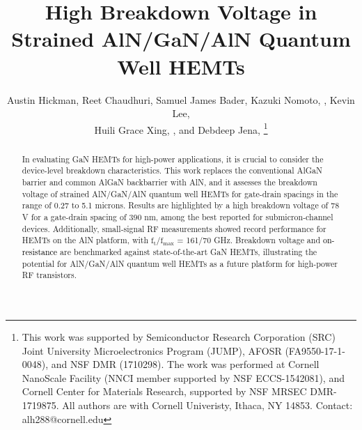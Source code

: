 \documentclass[journal]{IEEEtran}
\newif\ifarxiv
\begin{document}
\title{High Breakdown Voltage in Strained AlN/GaN/AlN Quantum Well HEMTs}

\author{Austin Hickman, Reet Chaudhuri, Samuel James Bader, Kazuki Nomoto, , Kevin Lee, \\ Huili Grace Xing, , and Debdeep Jena, %
\thanks{
  This work was supported by Semiconductor Research Corporation (SRC) Joint University Microelectronics Program (JUMP), AFOSR (FA9550-17-1-0048), and NSF DMR (1710298). The work was performed at Cornell NanoScale Facility (NNCI member supported by NSF ECCS-1542081), and Cornell Center for Materials Research, supported by NSF MRSEC DMR-1719875. All authors are with Cornell Univeristy, Ithaca, NY 14853. Contact: alh288@cornell.edu }}

\ifarxiv \else
{}%
{}
\fi
% 

\maketitle

\begin{abstract}
In evaluating GaN HEMTs for high-power applications, it is crucial to consider the device-level breakdown characteristics. This work replaces the conventional AlGaN barrier and common AlGaN backbarrier with AlN, and it assesses the breakdown voltage of strained AlN/GaN/AlN quantum well HEMTs for gate-drain spacings in the range of 0.27 to 5.1 microns. Results are highlighted by a high breakdown voltage of 78 V for a gate-drain spacing of 390 nm, among the best reported for submicron-channel devices. Additionally, small-signal RF measurements showed record performance for HEMTs on the AlN platform, with $\mathrm{f_t/f_{max}}$ = 161/70 GHz. Breakdown voltage and \textcolor{black}{on-resistance} are benchmarked against state-of-the-art GaN HEMTs, illustrating the potential for AlN/GaN/AlN quantum well HEMTs as a future platform for high-power RF transistors.
\end{abstract}
\end{document}
